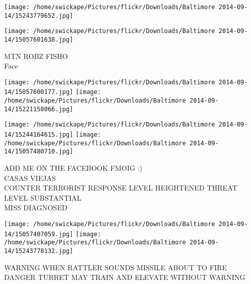 \documentclass[10pt,letterpaper]{article}
\begin{document}
\texttt{[image: /home/swickape/Pictures/flickr/Downloads/Baltimore 2014-09-14/15243779652.jpg]}

\vspace{0.25in}
\texttt{[image: /home/swickape/Pictures/flickr/Downloads/Baltimore 2014-09-14/15057601638.jpg]}

MTN ROBZ FISHO\\
Face\\
\pagebreak

\texttt{[image: /home/swickape/Pictures/flickr/Downloads/Baltimore 2014-09-14/15057600177.jpg]}
\texttt{[image: /home/swickape/Pictures/flickr/Downloads/Baltimore 2014-09-14/15221158066.jpg]}

\texttt{[image: /home/swickape/Pictures/flickr/Downloads/Baltimore 2014-09-14/15244164615.jpg]}
\texttt{[image: /home/swickape/Pictures/flickr/Downloads/Baltimore 2014-09-14/15057480710.jpg]}

ADD ME ON THE FACEBOOK FMOIG :)\\
CASAS VIEJAS\\
COUNTER TERRORIST RESPONSE LEVEL HEIGHTENED THREAT LEVEL SUBSTANTIAL\\
MISS DIAGNOSED\\
\pagebreak

\texttt{[image: /home/swickape/Pictures/flickr/Downloads/Baltimore 2014-09-14/15057407059.jpg]}
\texttt{[image: /home/swickape/Pictures/flickr/Downloads/Baltimore 2014-09-14/15243778132.jpg]}

WARNING WHEN RATTLER SOUNDS MISSILE ABOUT TO FIRE\\
DANGER TURRET MAY TRAIN AND ELEVATE WITHOUT WARNING\\
\pagebreak
\end{document}
